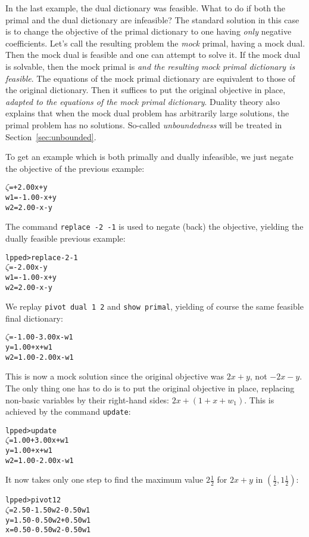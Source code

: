 \documentclass[ukenglish]{nik}
\begin{document}
In the last example, the dual dictionary was feasible. What to do if both the primal and
the dual dictionary are infeasible? The standard solution in this case is to change
the objective of the primal dictionary to one having \emph{only} negative coefficients.
Let's call the resulting problem the \emph{mock} primal, having a mock dual.
Then the mock dual is feasible and one can attempt to solve it. 
If the mock dual is solvable, then the mock primal is \emph{and the resulting
mock primal dictionary is feasible}. The equations of the mock primal dictionary
are equivalent to those of the original dictionary. Then it suffices to put the original objective
in place, \emph{adapted to the equations of the mock primal dictionary}.
Duality theory also explains that when the mock dual problem has arbitrarily large
solutions, the primal problem has no solutions. So-called \emph{unboundedness}
will be treated in Section~\ref{sec:unbounded}.

To get an example which is both primally and dually infeasible,
we just negate the objective of the previous example:
\begin{alltt}
 \(\zeta\) =        + 2.00x + y
w1 = - 1.00 -     x + y
w2 =   2.00 -     x - y
\end{alltt}
The command \verb|replace -2 -1| is used to negate (back) the objective,
yielding the dually feasible previous example:
\begin{alltt}
lpped> replace -2 -1
 \(\zeta\)  =        - 2.00x - y
w1 = - 1.00 -     x + y
w2 =   2.00 -     x - y
\end{alltt}
We replay \verb|pivot dual 1 2| and \verb|show primal|,
yielding of course the same feasible final dictionary:
\begin{alltt}
 \(\zeta\) = - 1.00 - 3.00x - w1
 y =   1.00 +     x + w1
w2 =   1.00 - 2.00x - w1
\end{alltt}
This is now a mock solution since the original objective was $2x+y$,
not $-2x-y$. The only thing one has to do is to put the original objective in place,
replacing non-basic variables by their right-hand sides: $2x+(1+x+w_1)$.
This is achieved by the command \verb|update|:
\begin{alltt}
lpped> update
 \(\zeta\) = 1.00 + 3.00x + w1
 y = 1.00 +     x + w1
w2 = 1.00 - 2.00x - w1
\end{alltt}
It now takes only one step to find the maximum value $2\frac{1}{2}$ 
for $2x+y$ in $(\frac{1}{2},1\frac{1}{2})$:
\begin{alltt}
lpped> pivot 1 2
 \(\zeta\) = 2.50 - 1.50w2 - 0.50w1
 y = 1.50 - 0.50w2 + 0.50w1
 x = 0.50 - 0.50w2 - 0.50w1
\end{alltt}
\end{document}
